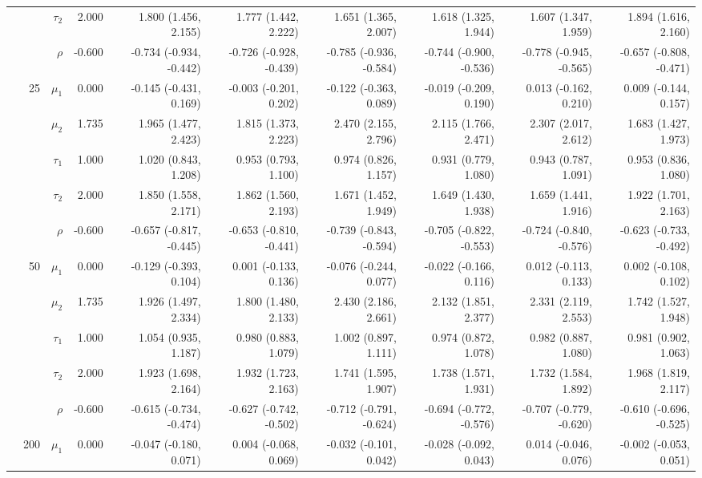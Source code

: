 \documentclass[
]{article}
\begin{document}
\begin{table}
\begin{tabular}[t]{rrrrrrrrrr}
 &  & $\tau_2$ & 2.000 & 1.800 (1.456, 2.155) & 1.777 (1.442, 2.222) & 1.651 (1.365, 2.007) & 1.618 (1.325, 1.944) & 1.607 (1.347, 1.959) & 1.894 (1.616, 2.160)\\
 &  & $\rho$ & -0.600 & -0.734 (-0.934, -0.442) & -0.726 (-0.928, -0.439) & -0.785 (-0.936, -0.584) & -0.744 (-0.900, -0.536) & -0.778 (-0.945, -0.565) & -0.657 (-0.808, -0.471)\\
\addlinespace
 & 25 & $\mu_1$ & 0.000 & -0.145 (-0.431, 0.169) & -0.003 (-0.201, 0.202) & -0.122 (-0.363, 0.089) & -0.019 (-0.209, 0.190) & 0.013 (-0.162, 0.210) & 0.009 (-0.144, 0.157)\\
 &  & $\mu_2$ & 1.735 & 1.965 (1.477, 2.423) & 1.815 (1.373, 2.223) & 2.470 (2.155, 2.796) & 2.115 (1.766, 2.471) & 2.307 (2.017, 2.612) & 1.683 (1.427, 1.973)\\
 &  & $\tau_1$ & 1.000 & 1.020 (0.843, 1.208) & 0.953 (0.793, 1.100) & 0.974 (0.826, 1.157) & 0.931 (0.779, 1.080) & 0.943 (0.787, 1.091) & 0.953 (0.836, 1.080)\\
 &  & $\tau_2$ & 2.000 & 1.850 (1.558, 2.171) & 1.862 (1.560, 2.193) & 1.671 (1.452, 1.949) & 1.649 (1.430, 1.938) & 1.659 (1.441, 1.916) & 1.922 (1.701, 2.163)\\
 &  & $\rho$ & -0.600 & -0.657 (-0.817, -0.445) & -0.653 (-0.810, -0.441) & -0.739 (-0.843, -0.594) & -0.705 (-0.822, -0.553) & -0.724 (-0.840, -0.576) & -0.623 (-0.733, -0.492)\\
\addlinespace
 & 50 & $\mu_1$ & 0.000 & -0.129 (-0.393, 0.104) & 0.001 (-0.133, 0.136) & -0.076 (-0.244, 0.077) & -0.022 (-0.166, 0.116) & 0.012 (-0.113, 0.133) & 0.002 (-0.108, 0.102)\\
 &  & $\mu_2$ & 1.735 & 1.926 (1.497, 2.334) & 1.800 (1.480, 2.133) & 2.430 (2.186, 2.661) & 2.132 (1.851, 2.377) & 2.331 (2.119, 2.553) & 1.742 (1.527, 1.948)\\
 &  & $\tau_1$ & 1.000 & 1.054 (0.935, 1.187) & 0.980 (0.883, 1.079) & 1.002 (0.897, 1.111) & 0.974 (0.872, 1.078) & 0.982 (0.887, 1.080) & 0.981 (0.902, 1.063)\\
 &  & $\tau_2$ & 2.000 & 1.923 (1.698, 2.164) & 1.932 (1.723, 2.163) & 1.741 (1.595, 1.907) & 1.738 (1.571, 1.931) & 1.732 (1.584, 1.892) & 1.968 (1.819, 2.117)\\
 &  & $\rho$ & -0.600 & -0.615 (-0.734, -0.474) & -0.627 (-0.742, -0.502) & -0.712 (-0.791, -0.624) & -0.694 (-0.772, -0.576) & -0.707 (-0.779, -0.620) & -0.610 (-0.696, -0.525)\\
\addlinespace
 & 200 & $\mu_1$ & 0.000 & -0.047 (-0.180, 0.071) & 0.004 (-0.068, 0.069) & -0.032 (-0.101, 0.042) & -0.028 (-0.092, 0.043) & 0.014 (-0.046, 0.076) & -0.002 (-0.053, 0.051)\\

\end{tabular}
\end{table}
\end{document}
